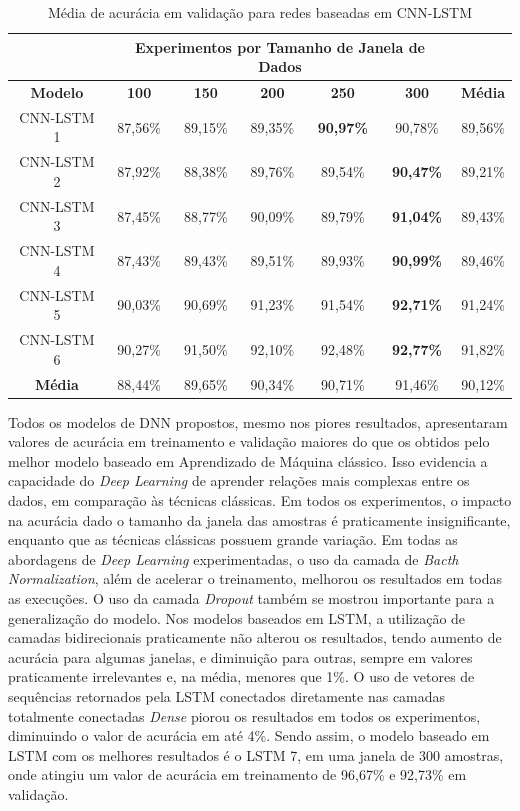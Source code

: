 \begin{table}[H]
\scriptsize
\centering
\caption{Média de acurácia em validação para redes baseadas em CNN-LSTM} 
\label{table:cnn_lstm_results_tipo_superficie_1}
\begin{tabular}{ccccccc}
\cmidrule(lr){2-6}
& \multicolumn{5}{c}{\textbf{Experimentos por Tamanho de Janela de Dados}} & \multicolumn{1}{c}{} \\ \midrule
\textbf{Modelo} & \textbf{100} & \textbf{150} & \textbf{200} & \textbf{250} & \textbf{300} & \textbf{Média} \\ \midrule
CNN-LSTM 1 & 87,56\% & 89,15\% & 89,35\% & \textbf{90,97\%} & 90,78\% & 89,56\% \\ \midrule
CNN-LSTM 2 & 87,92\% & 88,38\% & 89,76\% & 89,54\% & \textbf{90,47\%} & 89,21\% \\ \midrule
CNN-LSTM 3 & 87,45\% & 88,77\% & 90,09\% & 89,79\% & \textbf{91,04\%} & 89,43\% \\ \midrule
CNN-LSTM 4 & 87,43\% & 89,43\% & 89,51\% & 89,93\% & \textbf{90,99\%} & 89,46\% \\ \midrule
CNN-LSTM 5 & 90,03\% & 90,69\% & 91,23\% & 91,54\% & \textbf{92,71\%} & 91,24\% \\ \midrule
CNN-LSTM 6 & 90,27\% & 91,50\% & 92,10\% & 92,48\% &\cellcolor[HTML]{34FF34}\textbf{92,77\%} & 91,82\% \\ \midrule
\textbf{Média} & 88,44\% & 89,65\% & 90,34\% & 90,71\% & 91,46\% & 90,12\% \\ \bottomrule
\end{tabular}
\end{table}

Todos os modelos de DNN propostos, mesmo nos piores resultados, apresentaram valores de acurácia em treinamento e validação maiores do que os obtidos pelo melhor modelo baseado em Aprendizado de Máquina clássico. Isso evidencia a capacidade do \textit{Deep Learning} de aprender relações mais complexas entre os dados, em comparação às técnicas clássicas. Em todos os experimentos, o impacto na acurácia dado o tamanho da janela das amostras é praticamente insignificante, enquanto que as técnicas clássicas possuem grande variação. Em todas as abordagens de \textit{Deep Learning} experimentadas, o uso da camada de \textit{Bacth Normalization}, além de acelerar o treinamento, melhorou os resultados em todas as execuções. O uso da camada \textit{Dropout} também se mostrou importante para a generalização do modelo. Nos modelos baseados em LSTM, a utilização de camadas bidirecionais praticamente não alterou os resultados, tendo aumento de acurácia para algumas janelas, e diminuição para outras, sempre em valores praticamente irrelevantes e, na média, menores que 1\%. O uso de vetores de sequências retornados pela LSTM conectados diretamente nas camadas totalmente conectadas \textit{Dense} piorou os resultados em todos os experimentos, diminuindo o valor de acurácia em até 4\%. Sendo assim, o modelo baseado em LSTM com os melhores resultados é o LSTM 7, em uma janela de 300 amostras, onde atingiu um valor de acurácia em treinamento de 96,67\% e 92,73\% em validação.

